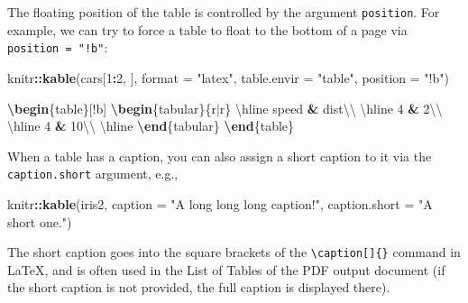 \documentclass[
  11pt,
]{krantz}
\newenvironment{Shaded}{\begin{snugshade}}{\end{snugshade}}
\newcommand{\DataTypeTok}[1]{\textcolor[rgb]{0.27,0.27,0.27}{#1}}
\newcommand{\DecValTok}[1]{\textcolor[rgb]{0.06,0.06,0.06}{#1}}
\newcommand{\ExtensionTok}[1]{#1}
\newcommand{\FunctionTok}[1]{\textcolor[rgb]{0,0,0}{#1}}
\newcommand{\KeywordTok}[1]{\textcolor[rgb]{0.27,0.27,0.27}{\textbf{#1}}}
\newcommand{\NormalTok}[1]{#1}
\newcommand{\OperatorTok}[1]{\textcolor[rgb]{0.43,0.43,0.43}{\textbf{#1}}}
\newcommand{\StringTok}[1]{\textcolor[rgb]{0.5,0.5,0.5}{#1}}
\begin{document}
The floating position of the table is controlled by the argument \texttt{position}. For example, we can try to force a table to float to the bottom of a page via \texttt{position\ =\ "!b"}:

\begin{Shaded}
\begin{Highlighting}[]
\NormalTok{knitr}\OperatorTok{::}\KeywordTok{kable}\NormalTok{(cars[}\DecValTok{1}\OperatorTok{:}\DecValTok{2}\NormalTok{, ], }\DataTypeTok{format =} \StringTok{"latex"}\NormalTok{, }\DataTypeTok{table.envir =} \StringTok{"table"}\NormalTok{, }\DataTypeTok{position =} \StringTok{"!b"}\NormalTok{)}
\end{Highlighting}
\end{Shaded}

\begin{Shaded}
\begin{Highlighting}[]
\KeywordTok{\textbackslash{}begin}\NormalTok{\{}\ExtensionTok{table}\NormalTok{\}[!b]}
\KeywordTok{\textbackslash{}begin}\NormalTok{\{}\ExtensionTok{tabular}\NormalTok{\}\{r|r\}}
\FunctionTok{\textbackslash{}hline}
\NormalTok{speed }\OperatorTok{&}\NormalTok{ dist}\FunctionTok{\textbackslash{}\textbackslash{}}
\FunctionTok{\textbackslash{}hline}
\NormalTok{4 }\OperatorTok{&}\NormalTok{ 2}\FunctionTok{\textbackslash{}\textbackslash{}}
\FunctionTok{\textbackslash{}hline}
\NormalTok{4 }\OperatorTok{&}\NormalTok{ 10}\FunctionTok{\textbackslash{}\textbackslash{}}
\FunctionTok{\textbackslash{}hline}
\KeywordTok{\textbackslash{}end}\NormalTok{\{}\ExtensionTok{tabular}\NormalTok{\}}
\KeywordTok{\textbackslash{}end}\NormalTok{\{}\ExtensionTok{table}\NormalTok{\}}
\end{Highlighting}
\end{Shaded}

When a table has a caption, you can also assign a short caption to it via the \texttt{caption.short} argument, e.g.,

\begin{Shaded}
\begin{Highlighting}[]
\NormalTok{knitr}\OperatorTok{::}\KeywordTok{kable}\NormalTok{(iris2, }\DataTypeTok{caption =} \StringTok{"A long long long caption!"}\NormalTok{, }\DataTypeTok{caption.short =} \StringTok{"A short one."}\NormalTok{)}
\end{Highlighting}
\end{Shaded}

The short caption goes into the square brackets of the \texttt{\textbackslash{}caption{[}{]}\{\}} command in LaTeX, and is often used in the List of Tables of the PDF output document (if the short caption is not provided, the full caption is displayed there).
\end{document}
